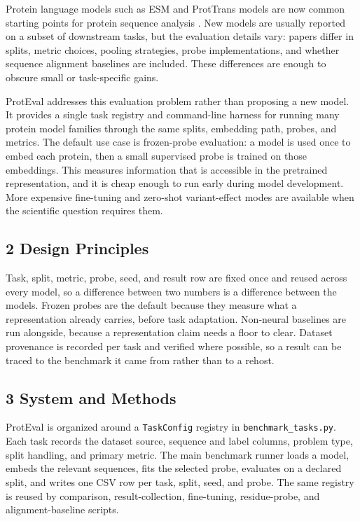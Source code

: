 \documentclass[
]{article}
\begin{document}
Protein language models such as ESM and ProtTrans models are now common
starting points for protein sequence analysis
\autocite{rives2021biological,lin2023evolutionary,elnaggar2021prottrans}.
New models are usually reported on a subset of downstream tasks, but the
evaluation details vary: papers differ in splits, metric choices,
pooling strategies, probe implementations, and whether sequence
alignment baselines are included. These differences are enough to
obscure small or task-specific gains.

ProtEval addresses this evaluation problem rather than proposing a new
model. It provides a single task registry and command-line harness for
running many protein model families through the same splits, embedding
path, probes, and metrics. The default use case is frozen-probe
evaluation: a model is used once to embed each protein, then a small
supervised probe is trained on those embeddings. This measures
information that is accessible in the pretrained representation, and it
is cheap enough to run early during model development. More expensive
fine-tuning and zero-shot variant-effect modes are available when the
scientific question requires them.

\subsection{2 Design Principles}\label{design-principles}

Task, split, metric, probe, seed, and result row are fixed once and
reused across every model, so a difference between two numbers is a
difference between the models. Frozen probes are the default because they
measure what a representation already carries, before task adaptation.
Non-neural baselines are run alongside, because a representation claim
needs a floor to clear. Dataset provenance is recorded per task and
verified where possible, so a result can be traced to the benchmark it
came from rather than to a rehost.

\subsection{3 System and Methods}\label{system-and-methods}

ProtEval is organized around a \texttt{TaskConfig} registry in
\texttt{benchmark\_tasks.py}. Each task records the dataset source,
sequence and label columns, problem type, split handling, and primary
metric. The main benchmark runner loads a model, embeds the relevant
sequences, fits the selected probe, evaluates on a declared split, and
writes one CSV row per task, split, seed, and probe. The same registry
is reused by comparison, result-collection, fine-tuning, residue-probe,
and alignment-baseline scripts.
\end{document}
